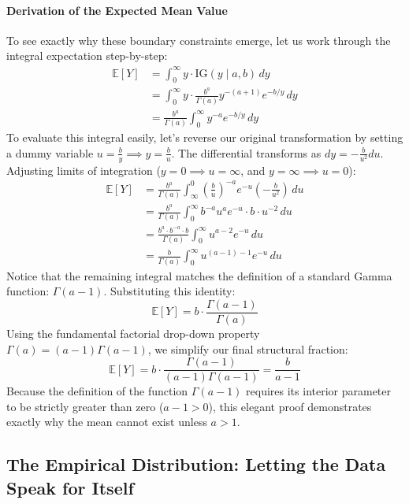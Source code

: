 \documentclass{article}
\begin{document}
\paragraph{Derivation of the Expected Mean Value}
To see exactly why these boundary constraints emerge, let us work through the integral expectation step-by-step:
\begin{align*}
\mathbb{E}[Y] &= \int_{0}^{\infty} y \cdot \text{IG}(y \mid a, b) \, dy \\
&= \int_{0}^{\infty} y \cdot \frac{b^a}{\Gamma(a)} y^{-(a+1)} e^{-b/y} \, dy \\
&= \frac{b^a}{\Gamma(a)} \int_{0}^{\infty} y^{-a} e^{-b/y} \, dy
\end{align*}
To evaluate this integral easily, let's reverse our original transformation by setting a dummy variable $u = \frac{b}{y} \implies y = \frac{b}{u}$. The differential transforms as $dy = -\frac{b}{u^2} du$. Adjusting limits of integration ($y=0 \implies u=\infty$, and $y=\infty \implies u=0$):
\begin{align*}
\mathbb{E}[Y] &= \frac{b^a}{\Gamma(a)} \int_{\infty}^{0} \left(\frac{b}{u}\right)^{-a} e^{-u} \left(-\frac{b}{u^2}\right) \, du \\
&= \frac{b^a}{\Gamma(a)} \int_{0}^{\infty} b^{-a} u^{a} e^{-u} \cdot b \cdot u^{-2} \, du \\
&= \frac{b^a \cdot b^{-a} \cdot b}{\Gamma(a)} \int_{0}^{\infty} u^{a-2} e^{-u} \, du \\
&= \frac{b}{\Gamma(a)} \int_{0}^{\infty} u^{(a-1)-1} e^{-u} \, du
\end{align*}
Notice that the remaining integral matches the definition of a standard Gamma function: $\Gamma(a-1)$. Substituting this identity:
\begin{equation*}
\mathbb{E}[Y] = b \cdot \frac{\Gamma(a-1)}{\Gamma(a)}
\end{equation*}
Using the fundamental factorial drop-down property $\Gamma(a) = (a-1)\Gamma(a-1)$, we simplify our final structural fraction:
\begin{equation*}
\mathbb{E}[Y] = b \cdot \frac{\Gamma(a-1)}{(a-1)\Gamma(a-1)} = \frac{b}{a-1}
\end{equation*}
Because the definition of the function $\Gamma(a-1)$ requires its interior parameter to be strictly greater than zero ($a-1 > 0$), this elegant proof demonstrates exactly why the mean cannot exist unless $a > 1$.

\subsection*{The Empirical Distribution: Letting the Data Speak for Itself}
\end{document}

